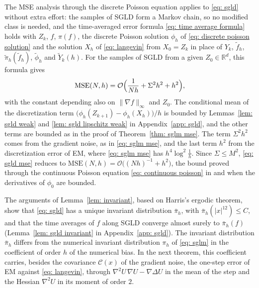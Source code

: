\documentclass{article}
\newcommand{\Le}{\leqslant}
\newcommand{\MSE}{\mathrm{MSE}}
\newcommand{\norm}[1]{\lVert #1 \rVert}
\numberwithin{equation}{section}
\begin{document}
The MSE analysis through the discrete Poisson equation applies to \eqref{eq: sgld} without extra effort: the samples of SGLD form a Markov chain, so no modified class is needed, and the time-averaged error formula \eqref{eq: time average formula} holds with $Z_k$, $f$, $\pi(f)$, the discrete Poisson solution $\phi_h$ of \eqref{eq: discrete poisson solution} and the solution $X_h$ of \eqref{eq: langevin} from $X_0 = Z_k$ in place of $Y_k$, $\tilde f_h$, $\tilde\pi_h(\tilde f_h)$, $\tilde\phi_h$ and $\tilde Y_k(h)$. For the samples of SGLD from a given $Z_0 \in \mathbb R^d$, this formula gives
\begin{equation}
    \MSE(N,h) = \mathcal O\Bigl( \frac{1}{Nh} + \Sigma^2 h^2 + h^2 \Bigr) ,
    \label{eq: sgld mse}
\end{equation}
with the constant depending also on $\norm{\nabla f}_\infty$ and $Z_0$. The conditional mean of the discretization term $\bigl( \phi_h(Z_{k+1}) - \phi_h(X_h) \bigr)/h$ is bounded by Lemmas~\ref{lem: sgld weak} and \ref{lem: sgld lipschitz weak} in Appendix~\ref{app: sgld}, and the other terms are bounded as in the proof of Theorem~\ref{thm: sglm mse}. The term $\Sigma^2 h^2$ comes from the gradient noise, as in \eqref{eq: sglm mse}, and the last term $h^2$ from the discretization error of EM, where \eqref{eq: sglm mse} has $h^4 \log^2\frac1h$. Since $\Sigma \Le M^2$, \eqref{eq: sgld mse} reduces to $\MSE(N,h) = \mathcal O\bigl( (Nh)^{-1} + h^2 \bigr)$, the bound proved through the continuous Poisson equation \eqref{eq: continuous poisson} in \citep[Theorem~9]{vollmer2016exploration} and \citep[Theorem~3]{chen2015convergence} when the derivatives of $\phi_0$ are bounded.

The arguments of Lemma~\ref{lem: invariant}, based on Harris's ergodic theorem, show that \eqref{eq: sgld} has a unique invariant distribution $\bar\pi_h$, with $\bar\pi_h(|x|^{12}) \Le C$, and that the time averages of $f$ along SGLD converge almost surely to $\bar\pi_h(f)$ (Lemma~\ref{lem: sgld invariant} in Appendix~\ref{app: sgld}). The invariant distribution $\bar\pi_h$ differs from the numerical invariant distribution $\pi_h$ of \eqref{eq: sglm} in the coefficient of order $h$ of the numerical bias. In the next theorem, this coefficient carries, besides the covariance $\mathcal C(x)$ of the gradient noise, the one-step error of EM against \eqref{eq: langevin}, through $\nabla^2 U\, \nabla U - \nabla \Delta U$ in the mean of the step and the Hessian $\nabla^2 U$ in its moment of order $2$.
\end{document}
